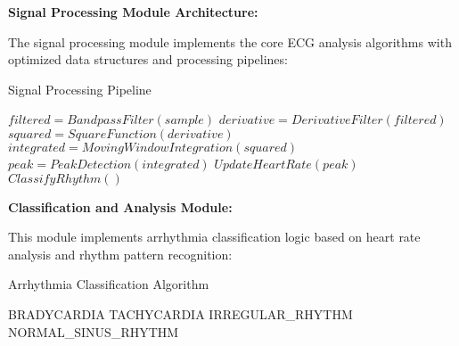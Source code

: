 \documentclass[12pt,a4paper]{article}
\begin{document}



\textbf{Signal Processing Module Architecture:}

The signal processing module implements the core ECG analysis algorithms with optimized data structures and processing pipelines:

\begin{algorithm}
\caption{Signal Processing Pipeline}
\begin{algorithmic}
    \STATE $filtered = BandpassFilter(sample)$
    \STATE $derivative = DerivativeFilter(filtered)$
    \STATE $squared = SquareFunction(derivative)$
    \STATE $integrated = MovingWindowIntegration(squared)$
    \STATE $peak = PeakDetection(integrated)$
        \STATE $UpdateHeartRate(peak)$
        \STATE $ClassifyRhythm()$
    \ENDIF
\ENDPROCEDURE
\end{algorithmic}
\end{algorithm}

\vspace{0.5cm}

\textbf{Classification and Analysis Module:}

This module implements arrhythmia classification logic based on heart rate analysis and rhythm pattern recognition:

\begin{algorithm}
\caption{Arrhythmia Classification Algorithm}
\begin{algorithmic}
        \RETURN BRADYCARDIA
        \RETURN TACHYCARDIA
        \RETURN IRREGULAR\_RHYTHM
    \ELSE
        \RETURN NORMAL\_SINUS\_RHYTHM
    \ENDIF
\ENDPROCEDURE
\end{algorithmic}
\end{algorithm}
\end{document}
